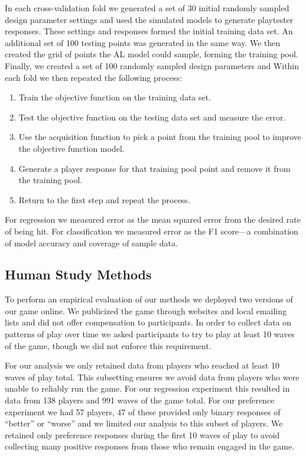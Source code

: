 \documentclass{sig-alternate}
\begin{document}
In each cross-validation fold we generated a set of 30 initial randomly sampled design parameter settings and used the simulated models to generate playtester responses.
These settings and responses formed the initial training data set.
An additional set of 100 testing points was generated in the same way.
We then created the grid of points the AL model could sample, forming the training pool.
Finally, we created a set of 100 randomly sampled design parameters and 
Within each fold we then repeated the following process:
\begin{enumerate}
\item Train the objective function on the training data set.
\item Test the objective function on the testing data set and measure the error.
\item Use the acquisition function to pick a point from the training pool to improve the objective function model.
\item Generate a player response for that training pool point and remove it from the training pool.
\item Return to the first step and repeat the process.
\end{enumerate}
\noindent For regression we measured error as the mean squared error from the desired rate of being hit.
For classification we measured error as the F1 score---a combination of model accuracy and coverage of sample data.



\subsection{Human Study Methods}

To perform an empirical evaluation of our methods we deployed two versions of our game online.
We publicized the game through websites and local emailing lists and did not offer compensation to participants.
In order to collect data on patterns of play over time we asked participants to try to play at least 10 waves of the game, though we did not enforce this requirement.

For our analysis we only retained data from players who reached at least 10 waves of play total. %
This subsetting ensures we avoid data from players who were unable to reliably run the game.
For our regression experiment this resulted in data from 138 players and 991 waves of the game total.
For our preference experiment we had 57 players, 47 of these provided only binary responses of ``better'' or ``worse'' and we limited our analysis to this subset of players.
We retained only preference responses during the first 10 waves of play to avoid collecting many positive responses from those who remain engaged in the game.
\end{document}
